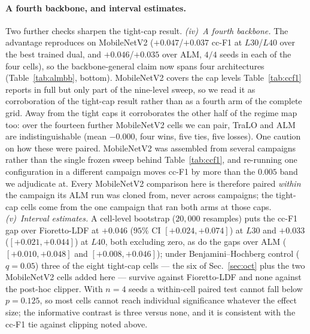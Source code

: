 \documentclass[10pt]{article}
\begin{document}
{\color{blue}
\paragraph{A fourth backbone, and interval estimates.}
Two further checks sharpen the tight-cap result. \emph{(iv)~A fourth
backbone.} The advantage reproduces on MobileNetV2 ($+0.047$/$+0.037$ cc-F1 at
$L30$/$L40$ over the best trained dual, and $+0.046$/$+0.035$ over ALM, $4/4$
seeds in each of the four cells), so the backbone-general claim now spans four
architectures (Table~\ref{tab:almbb}, bottom). MobileNetV2 covers the cap levels
Table~\ref{tab:ccf1} reports in full but only part of the nine-level sweep, so we
read it as corroboration of the tight-cap result rather than as a fourth arm of
the complete grid. Away from the tight caps it corroborates the other half of the
regime map too: over the fourteen further MobileNetV2 cells we can pair, TraLO
and ALM are indistinguishable (mean $-0.000$, four wins, five ties, five losses).
One caution on how these were paired. MobileNetV2 was assembled from several
campaigns rather than the single frozen sweep behind
Table~\ref{tab:ccf1}, and re-running one configuration in a different campaign
moves cc-F1 by more than the $0.005$ band we adjudicate at. Every MobileNetV2
comparison here is therefore paired \emph{within} the campaign its ALM run was
cloned from, never across campaigns; the tight-cap cells come from the one
campaign that ran both arms at those caps. \emph{(v)~Interval estimates.} A
cell-level bootstrap ($20{,}000$ resamples) puts the cc-F1 gap over Fioretto-LDF at
$+0.046$ ($95\%$ CI $[{+}0.024,{+}0.074]$) at $L30$ and $+0.033$
($[{+}0.021,{+}0.044]$) at $L40$, both excluding zero, as do the gaps over ALM
($[{+}0.010,{+}0.048]$ and $[{+}0.008,{+}0.046]$); under Benjamini--Hochberg control
($q{=}0.05$) three of the eight tight-cap cells --- the six of Sec.~\ref{sec:oct} plus the
two MobileNetV2 cells added here --- survive against Fioretto-LDF and none
against the post-hoc clipper. With $n{=}4$ seeds a within-cell paired test cannot fall
below $p{=}0.125$, so most cells cannot reach individual significance whatever the effect
size; the informative contrast is three versus none, and it is consistent with the cc-F1
tie against clipping noted above.}
\end{document}
